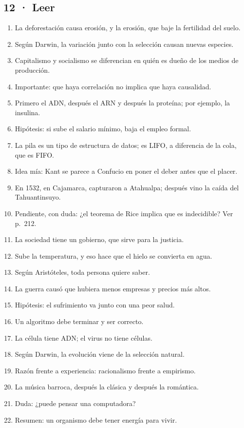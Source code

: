 \documentclass[11pt,a4paper]{article}
\begin{document}
\subsection*{12 · Leer}
\begin{enumerate}\small
\item La deforestación causa erosión, y la erosión, que baje la fertilidad del suelo.
\item Según Darwin, la variación junto con la selección causan nuevas especies.
\item Capitalismo y socialismo se diferencian en quién es dueño de los medios de producción.
\item Importante: que haya correlación no implica que haya causalidad.
\item Primero el ADN, después el ARN y después la proteína; por ejemplo, la insulina.
\item Hipótesis: si sube el salario mínimo, baja el empleo formal.
\item La pila es un tipo de estructura de datos; es LIFO, a diferencia de la cola, que es FIFO.
\item Idea mía: Kant se parece a Confucio en poner el deber antes que el placer.
\item En 1532, en Cajamarca, capturaron a Atahualpa; después vino la caída del Tahuantinsuyo.
\item Pendiente, con duda: ¿el teorema de Rice implica que es indecidible? Ver p.~212.
\item La sociedad tiene un gobierno, que sirve para la justicia.
\item Sube la temperatura, y eso hace que el hielo se convierta en agua.
\item Según Aristóteles, toda persona quiere saber.
\item La guerra causó que hubiera menos empresas y precios más altos.
\item Hipótesis: el sufrimiento va junto con una peor salud.
\item Un algoritmo debe terminar y ser correcto.
\item La célula tiene ADN; el virus no tiene células.
\item Según Darwin, la evolución viene de la selección natural.
\item Razón frente a experiencia: racionalismo frente a empirismo.
\item La música barroca, después la clásica y después la romántica.
\item Duda: ¿puede pensar una computadora?
\item Resumen: un organismo debe tener energía para vivir.
\end{enumerate}
\end{document}
